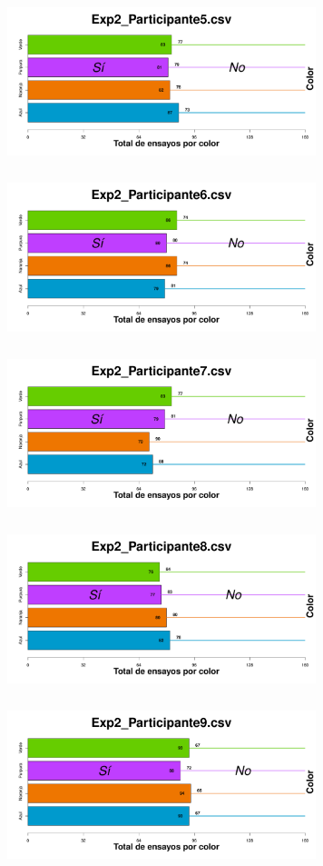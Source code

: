 \documentclass[a4paper ]{article}
\begin{document}
\begin{figure}[th]
\includegraphics[width=9cm, height=5cm]{Figures/BiasColor_Exp2_P5} \includegraphics[width=9cm, height=5cm]{Figures/BiasColor_Exp2_P6}
\includegraphics[width=9cm, height=5cm]{Figures/BiasColor_Exp2_P7} \includegraphics[width=9cm, height=5cm]{Figures/BiasColor_Exp2_P8} 
\includegraphics[width=9cm, height=5cm]{Figures/BiasColor_Exp2_P9}
\end{figure}
\end{document}
